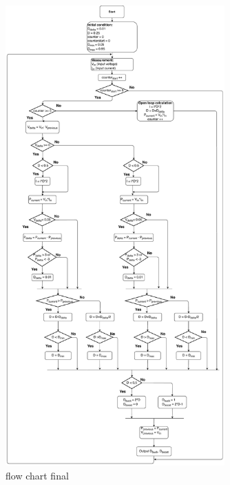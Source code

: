 \begin{figure}[H]
	\begin{center}
		\includegraphics[width=0.75\textwidth]{../Pictures/2018_11_15_Flow_chart_MPPT_Buck-Boost_converter}
		\caption{flow chart final }
		\label{fcfinal}
	\end{center}	
\end{figure}
